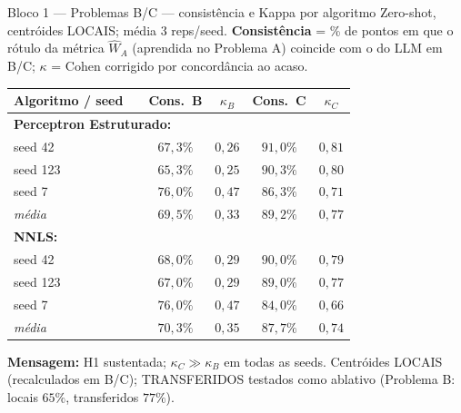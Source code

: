 \documentclass[aspectratio=169,10pt]{beamer}
\begin{document}
\begin{frame}{Bloco 1 --- Problemas B/C --- consist\^encia e Kappa por algoritmo}
  \scriptsize
  Zero-shot, centr\'oides LOCAIS; m\'edia 3 reps/seed. \textbf{Consist\^encia} = \% de pontos em que o r\'otulo da m\'etrica $\hat W_A$ (aprendida no Problema A) coincide com o do LLM em B/C; $\kappa$ = Cohen corrigido por concord\^ancia ao acaso.
  \begin{center}
  \begin{tabular}{llcccc}
    \toprule
    Algoritmo / seed & & Cons.\ B & $\kappa_B$ & Cons.\ C & $\kappa_C$ \\
    \midrule
    \multicolumn{6}{l}{\textbf{Perceptron Estruturado:}} \\
    seed 42  & & $67{,}3\%$ & $0{,}26$ & $91{,}0\%$ & $0{,}81$ \\
    seed 123 & & $65{,}3\%$ & $0{,}25$ & $90{,}3\%$ & $0{,}80$ \\
    seed 7   & & $76{,}0\%$ & $0{,}47$ & $86{,}3\%$ & $0{,}71$ \\
    \textit{m\'edia} & & $69{,}5\%$ & $0{,}33$ & $89{,}2\%$ & $0{,}77$ \\
    \midrule
    \multicolumn{6}{l}{\textbf{NNLS:}} \\
    seed 42  & & $68{,}0\%$ & $0{,}29$ & $90{,}0\%$ & $0{,}79$ \\
    seed 123 & & $67{,}0\%$ & $0{,}29$ & $89{,}0\%$ & $0{,}77$ \\
    seed 7   & & $76{,}0\%$ & $0{,}47$ & $84{,}0\%$ & $0{,}66$ \\
    \textit{m\'edia} & & $70{,}3\%$ & $0{,}35$ & $87{,}7\%$ & $0{,}74$ \\
    \bottomrule
  \end{tabular}
  \end{center}
  \medskip
  \textbf{Mensagem:} H1 sustentada; $\kappa_C \gg \kappa_B$ em todas as seeds. Centr\'oides LOCAIS (recalculados em B/C); TRANSFERIDOS testados como ablativo (Problema B: locais $65\%$, transferidos $77\%$).
\end{frame}
\end{document}
